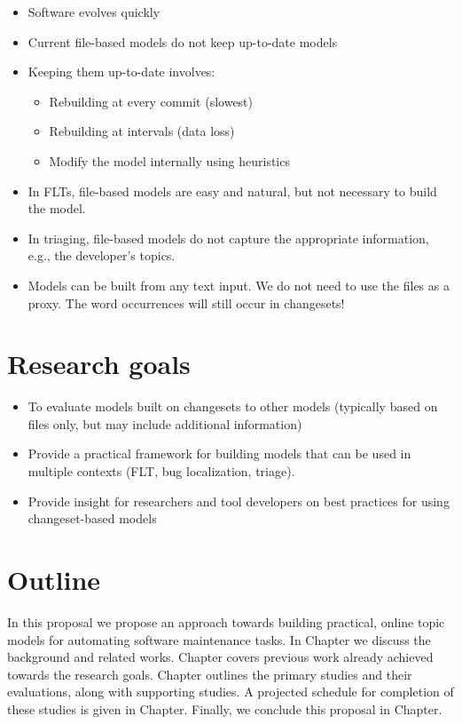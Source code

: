 \begin{itemize}
\itemsep1pt\parskip0pt
\item
  Software evolves quickly
\item
  Current file-based models do not keep up-to-date models
\item
  Keeping them up-to-date involves:

  \begin{itemize}
  \itemsep1pt\parskip0pt
  \item
    Rebuilding at every commit (slowest)
  \item
    Rebuilding at intervals (data loss)
  \item
    Modify the model internally using heuristics
  \end{itemize}
\item
  In FLTs, file-based models are easy and natural, but not necessary to
  build the model.
\item
  In triaging, file-based models do not capture the appropriate
  information, e.g., the developer's topics.
\item
  Models can be built from any text input. We do not need to use the
  files as a proxy. The word occurrences will still occur in changesets!
\end{itemize}

\section{Research goals}\label{research-goals}

\begin{itemize}
\itemsep1pt\parskip0pt
\item
  To evaluate models built on changesets to other models (typically
  based on files only, but may include additional information)
\item
  Provide a practical framework for building models that can be used in
  multiple contexts (FLT, bug localization, triage).
\item
  Provide insight for researchers and tool developers on best practices
  for using changeset-based models
\end{itemize}

\section{Outline}\label{outline}

In this proposal we propose an approach towards building practical,
online topic models for automating software maintenance tasks. In
Chapter we discuss the background and related works.
Chapter covers previous work already achieved towards
the research goals. Chapter outlines the primary
studies and their evaluations, along with supporting studies. A
projected schedule for completion of these studies is given in
Chapter. Finally, we conclude this proposal in
Chapter.
